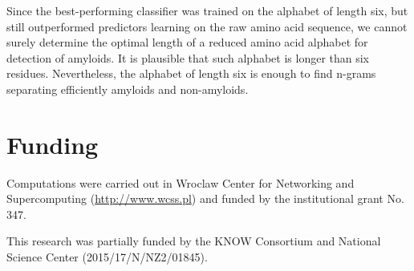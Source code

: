\documentclass{bioinfo}
\begin{document}
  Since the best-performing classifier was trained on the alphabet of length 
six, but still outperformed predictors learning on the raw amino acid sequence, 
we cannot surely determine the optimal length of a reduced amino acid alphabet 
for detection of amyloids. It is plausible that such alphabet is longer than 
six residues. Nevertheless, the alphabet of length six is enough to find 
n-grams separating efficiently amyloids and non-amyloids. 

%
%

\section*{Funding}

Computations were carried out in Wroclaw Center for Networking 
and Supercomputing (\url{http://www.wcss.pl}) and funded by the
institutional grant No. 347.

This research was partially funded by the KNOW Consortium and
National Science Center (2015/17/N/NZ2/01845).


%
%
%
%
%
%
%

\end{document}
